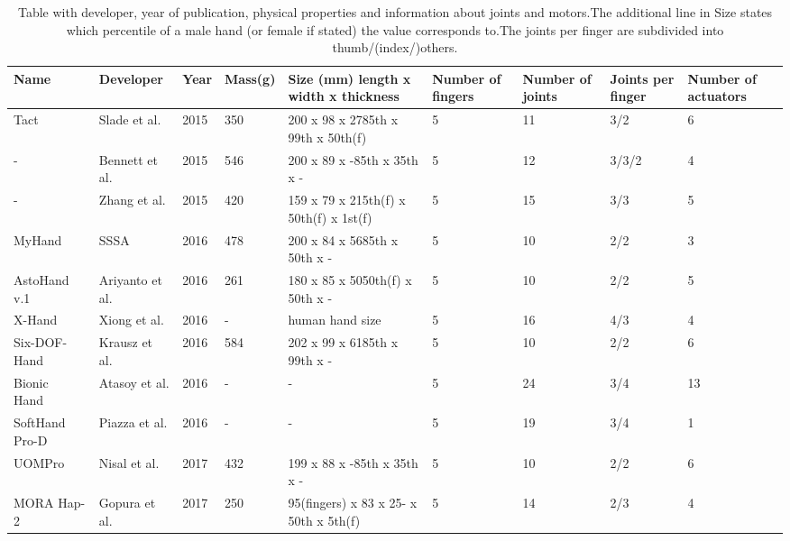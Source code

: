 \documentclass[a4paper, 10pt, conference]{ieeeconf}      %
\begin{document}
\begin{table}

\begin{tabular}{p{2.4cm}|p{1.8cm}|p{0.8cm}|p{1cm}|p{2.6cm}|p{1.2cm}|p{1.2cm}|p{1.2cm}|p{1.2cm}}

Name & Developer & Year & Mass(g) & Size (mm) length x width x thickness & Number of fingers & Number of joints & Joints per finger & Number of actuators\\
\hline
Tact~\cite{tact} & Slade et al. & 2015 & 350 & 200 x 98 x 27\newline 85th x 99th x 50th(f) & 5 & 11 & 3/2 & 6\\
\hline
-~\cite{bennett} & Bennett et al. & 2015 & 546 & 200 x 89 x -\newline 85th x 35th x - & 5 & 12 & 3/3/2 & 4\\
\hline
-~\cite{zhang} & Zhang et al. & 2015 & 420 & 159 x 79 x 21\newline 5th(f) x 50th(f) x 1st(f) & 5 & 15 & 3/3 & 5\\
\hline
MyHand~\cite{myhand} & SSSA & 2016 & 478 & 200 x 84 x 56\newline 85th x 50th x - & 5 & 10 & 2/2 & 3\\
\hline
AstoHand v.1~\cite{astohand} & Ariyanto et al. & 2016 & 261 & 180 x 85 x 50\newline 50th(f) x 50th x - & 5 & 10 & 2/2 & 5\\
\hline
X-Hand~\cite{xhand}& Xiong et al. & 2016 & - & human hand size & 5 & 16 & 4/3 & 4\\
\hline
Six-DOF-Hand~\cite{6dofhand} & Krausz et al. & 2016 & 584 & 202 x 99 x 61\newline 85th x 99th x - & 5 & 10 & 2/2 & 6\\
\hline
Bionic Hand~\cite{bionichand} & Atasoy et al. & 2016 & - & - & 5 & 24 & 3/4 & 13\\
\hline
SoftHand Pro-D~\cite{softhand} & Piazza et al. & 2016 & - & - & 5 & 19 & 3/4 & 1\\
\hline
UOMPro~\cite{uompro} & Nisal et al. & 2017 & 432 & 199 x 88 x -\newline 85th x 35th x - & 5 & 10 & 2/2 & 6\\
\hline
MORA Hap-2~\cite{morahap2} & Gopura et al. & 2017 & 250 & 95(fingers) x 83 x 25\newline - x 50th x 5th(f) & 5 & 14 & 2/3 & 4\\


\end{tabular}

\caption{Table with developer, year of publication, physical properties and information about joints and motors.\newline The additional line in Size states which percentile of a male hand (or female if stated) the value corresponds to.\newline The joints per finger are subdivided into thumb/(index/)others.}
\label{table:table1}

\end{table}
\end{document}
